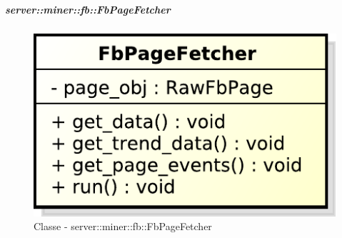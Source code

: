 		\subparagraph{server::miner::fb::FbPageFetcher} %
		\label{subp:server_miner_fb_FbPageFetcher}
		    \begin{figure}[!htbp]
 		 		\centering
 				\centerline{\includegraphics[scale=0.75]{./images/server/classes/miner/fb_page_fetcher.pdf}}
 				\caption{Classe - server::miner::fb::FbPageFetcher}
			\end{figure}
